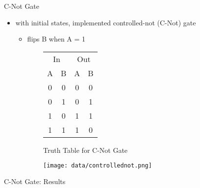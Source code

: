\documentclass{beamer}
\begin{document}
\begin{frame}{C-Not Gate}
	\begin{itemize}
	\item with initial states, implemented controlled-not (C-Not) gate \cite{cnot}
	\begin{itemize}
		\item flips B when A = 1
	\end{itemize}
	\end{itemize}
	\begin{figure}[htb]
	\begin{minipage}{0.3\textwidth}
		\begin{centering}
	\begin{figure}
	\begin{tabular}{c c | c c}
	\multicolumn{2}{c|}{In} & \multicolumn{2}{|c}{Out} \\
	A & B & A & B \\
	\hline
	0 & 0 & 0 & 0 \\
	0 & 1 & 0 & 1 \\
	1 & 0 & 1 & 1 \\
	1 & 1 & 1 & 0 \\
	\end{tabular}
	\caption*{Truth Table for C-Not Gate}
	\end{figure}
		\end{centering}
	\end{minipage}%
	\begin{minipage}[t]{0.7\textwidth}
	\begin{centering}
		\begin{figure}
	\texttt{[image: data/controllednot.png]}
	\end{figure}
	\end{centering}
	\end{minipage}%
	\end{figure}
\end{frame}

\begin{frame}{C-Not Gate: Results}
	\vspace{-2em}
	\begin{figure}
		\\
	\end{figure}
\end{frame}
\end{document}
